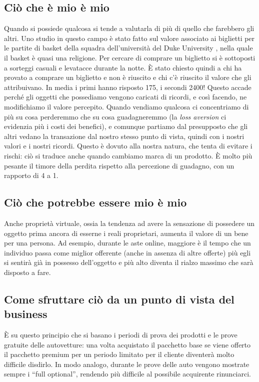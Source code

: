 \subsection{Ciò che è mio è mio}
Quando si possiede qualcosa si tende a valutarla di più di quello che farebbero
gli altri.
Uno studio in questo campo è stato fatto sul valore associato ai biglietti per
le partite di basket della squadra dell'università del Duke University
,
nella quale il basket è quasi una religione. Per
cercare di comprare un biglietto si è sottoposti a sorteggi casuali e levatacce
durante la notte. È stato chiesto quindi a chi ha provato a comprare un
biglietto e non è riuscito e chi c'è riuscito il valore che gli attribuivano.
In media i primi hanno risposto 175\textdollar{}, i secondi 2400\textdollar{}!
Questo accade perché gli oggetti che possediamo vengono caricati di ricordi, e
così facendo, ne modifichiamo il valore percepito. Quando vendiamo qualcosa ci
concentriamo di più su cosa perderemmo che su cosa guadagneremmo (la
\textit{loss aversion} ci evidenzia più i costi dei benefici), e comunque
partiamo dal presupposto che gli altri vedano la transazione dal nostro stesso
punto di vista, quindi con i nostri valori e i nostri ricordi.
Questo è dovuto alla nostra natura, che tenta di evitare i rischi: ciò
si traduce anche quando cambiamo marca di un prodotto.
È molto più pesante il timore della perdita rispetto alla percezione di
guadagno, con un rapporto di 4 a 1.

\subsection{Ciò che potrebbe essere mio è mio}
Anche proprietà virtuale, ossia la tendenza ad avere la sensazione di possedere
un oggetto prima ancora di esserne i reali proprietari, aumenta il valore di un
bene per una persona. Ad esempio, durante le aste online, maggiore è il tempo
che un individuo passa come miglior offerente (anche in assenza di altre
offerte) più egli si sentirà già in possesso dell'oggetto e più alto diventa il
rialzo massimo che sarà disposto a fare.

\subsection{Come sfruttare ciò da un punto di vista del business}
È su questo principio che si basano i periodi di prova dei prodotti e le prove
gratuite delle autovetture: una volta acquistato il pacchetto base se viene
offerto il pacchetto premium per un periodo limitato per il cliente diventerà
molto difficile disdirlo. In modo analogo, durante le prove delle auto vengono
mostrate sempre i ``full optional'', rendendo più difficile al possibile
acquirente rinunciarci.
